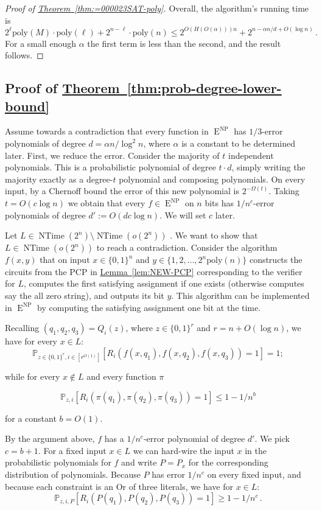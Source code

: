 \documentclass[11pt]{article}
\newcommand{\expref}[2]{\texorpdfstring{\hyperref[#2]{#1~\ref{#2}}}{#1~\ref{#2}}}
\DeclareMathOperator{\NTime}{\mathrm{NTime}}  %
\DeclareMathOperator{\NP}{\mathrm{NP}}  %
\DeclareMathOperator{\EEE}{\mathrm{E}}  %
\newcommand{\zo}{\{0, 1\}}
\renewcommand{\P}{\mathbb{P}}
\newcommand{\poly}{\mathrm{poly}}
\renewcommand{\a}{\alpha}
\begin{document}
\begin{proof}[Proof of \expref{Theorem}{thm:=000023SAT-poly}]
Overall, the algorithm's running time is 
\[
2^{\ell}\poly(M)\cdot\poly(\ell)+2^{n-\ell}\cdot\poly(n)\le2^{O(H(O(\alpha)))n}+2^{n-\alpha n/d+O(\log n)}\,.
\]
For a small enough $\alpha$ the first term is less than the second,
and the result follows.
\end{proof}

\subsection{Proof of \expref{Theorem}{thm:prob-degree-lower-bound}}

Assume towards a contradiction that every function in $\EEE^{\NP}$ has
$1/3$-error polynomials of degree $d=\alpha n/\log^{2}n$, where
$\a$ is a constant to be determined later. First, we reduce the error.
Consider the majority of $t$ independent polynomials. This is a probabilistic
polynomial of degree $t\cdot d$, simply writing the majority exactly
as a degree-$t$ polynomial and composing polynomials. On every input,
by a Chernoff bound the error of this new polynomial is $2^{-\Omega(t)}$.
Taking $t=O(c\log n)$ we obtain that every $f\in \EEE^{\NP}$ on $n$
bits has $1/n^{c}$-error polynomials of degree $d':=O(dc\log n)$.
We will set $c$ later.

Let $L\in\mathrm{\NTime}(2^{n})\setminus\mathrm{\NTime}(o(2^{n}))$
\cite{Cook73,SeiferasFM78,Zak83}. We want to show that $L\in\mathrm{\NTime}(o(2^{n}))$
to reach a contradiction. Consider the algorithm $f(x,y)$ that on
input $x\in\zo^{n}$ and $y\in\{1,2,\ldots,2^{n}\poly(n)\}$ constructs
the circuits from the PCP in \expref{Lemma}{lem:NEW-PCP} corresponding
to the verifier for $L$, computes the first satisfying assignment
if one exists (otherwise computes say the all zero string), and outputs
its bit $y$. This algorithm can be implemented in $\EEE^{\NP}$ by computing
the satisfying assignment one bit at the time.

Recalling $(q_{1},q_{2},q_{3})=Q_{i}(z)$, where $z\in\zo^{r}$ and
$r=n+O(\log n)$, we have for every $x\in L$:
\[
\P_{z\in\zo^{r},i\in[r^{O(1)}]}[R_{i}(f(x,q_{1}),f(x,q_{2}),f(x,q_{3}))=1]=1;
\]

while for every $x\not\in L$ and every function $\pi$

\[
\P_{z,i}[R_{i}(\pi(q_{1}),\pi(q_{2}),\pi(q_{3}))=1]\le1-1/n^{b}
\]

for a constant $b=O(1)$.

By the argument above, $f$ has a $1/n^{c}$-error polynomial of degree
$d'$. We pick $c=b+1$. For a fixed input $x\in L$ we can hard-wire
the input $x$ in the probabilistic polynomials for $f$ and write
$P=P_{x}$ for the corresponding distribution of polynomials. Because
$P$ has error $1/n^{c}$ on every fixed input, and because each constraint
is an Or of three literals, we have for $x\in L$:
\[
\P_{z,i,P}[R_{i}(P(q_{1}),P(q_{2}),P(q_{3}))=1]\ge1-1/n^{c}\,.
\]
\end{document}
